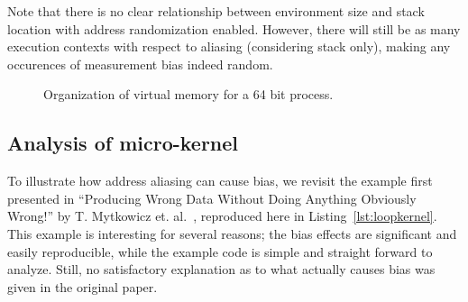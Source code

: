 \documentclass[a4paper,10pt,twocolumn,twoside]{article}
\begin{document}
Note that there is no clear relationship between environment size and stack location with address randomization enabled.
However, there will still be as many execution contexts with respect to aliasing (considering stack only), making any occurences of measurement bias indeed random.

\begin{figure}[float=t]
  \caption{Organization of virtual memory for a 64 bit process.}
  \label{fig:virtualmemory}
\end{figure}

\subsection{Analysis of micro-kernel}
To illustrate how address aliasing can cause bias, we revisit the example first presented in ``Producing Wrong Data Without Doing Anything Obviously Wrong!'' by T. Mytkowicz et. al.~\cite{Mytkowicz:2009:WrongData}, reproduced here in Listing~\ref{lst:loopkernel}. 
This example is interesting for several reasons; the bias effects are significant and easily reproducible, while the example code is simple and straight forward to analyze.
Still, no satisfactory explanation as to what actually causes bias was given in the original paper.
\end{document}
